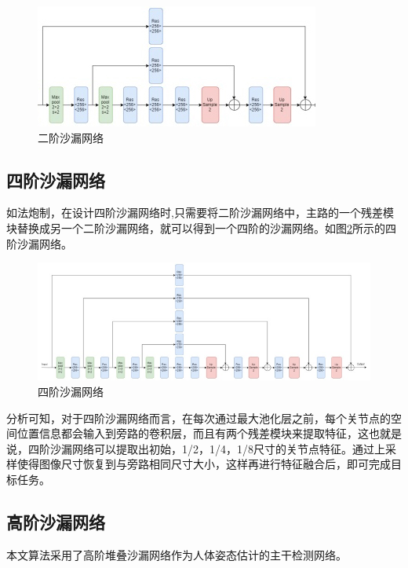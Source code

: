 \begin{figure}[h]
	\includegraphics[width=\textwidth]{pic/2_k_hourglass.jpg}
	\caption{二阶沙漏网络}
	\label{2_hg}
\end{figure}

\subsection{四阶沙漏网络}

如法炮制，在设计四阶沙漏网络时,只需要将二阶沙漏网络中，主路的一个残差模块替换成另一个二阶沙漏网络，就可以得到一个四阶的沙漏网络。如图\ref{4_hg}所示的四阶沙漏网络。

\begin{figure}[h]
	\includegraphics[width=\textwidth]{pic/4_k_hourglass.jpg}
	\caption{四阶沙漏网络}
	\label{4_hg}
\end{figure}

分析可知，对于四阶沙漏网络而言，在每次通过最大池化层之前，每个关节点的空间位置信息都会输入到旁路的卷积层，而且有两个残差模块来提取特征，这也就是说，四阶沙漏网络可以提取出初始，1/2，1/4，1/8尺寸的关节点特征。通过上采样使得图像尺寸恢复到与旁路相同尺寸大小，这样再进行特征融合后，即可完成目标任务。

\subsection{高阶沙漏网络}

本文算法采用了高阶堆叠沙漏网络作为人体姿态估计的主干检测网络。

